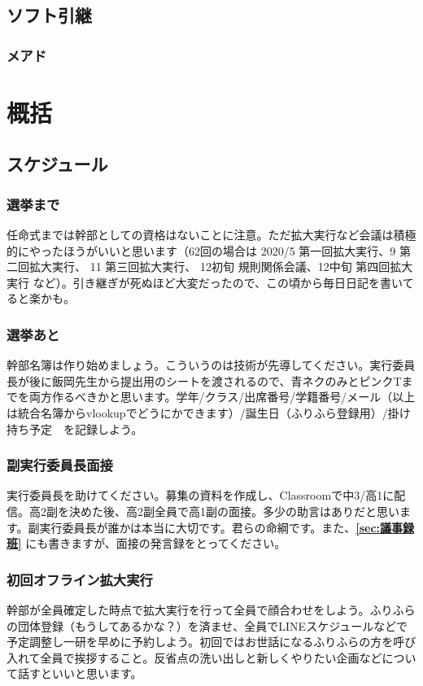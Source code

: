 \documentclass[dvipdfmx,jb5]{jarticle}
\begin{document}
 \subsection{ソフト引継}
 \subsubsection{メアド}


\section{概括}
\subsection{スケジュール}
\subsubsection{選挙まで}
任命式までは幹部としての資格はないことに注意。ただ拡大実行など会議は積極的にやったほうがいいと思います（62回の場合は 2020/5 第一回拡大実行、9 第二回拡大実行、 11 第三回拡大実行、 12初旬 規則関係会議、12中旬 第四回拡大実行 など）。引き継ぎが死ぬほど大変だったので、この頃から毎日日記を書いてると楽かも。

\subsubsection{選挙あと}
幹部名簿は作り始めましょう。こういうのは技術が先導してください。実行委員長が後に飯岡先生から提出用のシートを渡されるので、青ネクのみとピンクTまでを両方作るべきかと思います。学年/クラス/出席番号/学籍番号/メール（以上は統合名簿からvlookupでどうにかできます）/誕生日（ふりふら登録用）/掛け持ち予定　を記録しよう。

\subsubsection{副実行委員長面接}
実行委員長を助けてください。募集の資料を作成し、Classroomで中3/高1に配信。高2副を決めた後、高2副全員で高1副の面接。多少の助言はありだと思います。副実行委員長が誰かは本当に大切です。君らの命綱です。また、{\bf \ref{sec:議事録班}} にも書きますが、面接の発言録をとってください。

\subsubsection{初回オフライン拡大実行}
幹部が全員確定した時点で拡大実行を行って全員で顔合わせをしよう。ふりふらの団体登録（もうしてあるかな？）を済ませ、全員でLINEスケジュールなどで予定調整し一研を早めに予約しよう。初回ではお世話になるふりふらの方を呼び入れて全員で挨拶すること。反省点の洗い出しと新しくやりたい企画などについて話すといいと思います。
\end{document}
